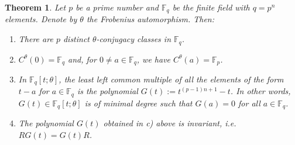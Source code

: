 \documentclass{amsproc}
\newtheorem{theorem}{Theorem}[section]
\numberwithin{equation}{section}
\begin{document}
\begin{theorem}
	\label{finite fields}	
	Let $p$ be a prime number and $\mathbb F_q$ be the finite field
	with $q=p^n$ elements.  Denote by $\theta$ the Frobenius
	automorphism.  Then:
	\begin{enumerate}
		\item[a)] There are $p$ distinct $\theta$-conjugacy classes in $\mathbb F_q$.
		\item[b)] $C^{\theta}(0)=\mathbb F_q$ and, for $0\ne a\in \mathbb F_q$, we have
		$C^{\theta}(a)=\mathbb F_p$.
		\item[c)] In $\mathbb F_q[t;\theta]$, the least left common multiple of all the elements
		of the form $t-a$ for $ a\in\mathbb F_q$ is the polynomial
		$G(t):=t^{(p-1)n +1}-t$.  In other words, $G(t)\in \mathbb
		F_q[t;\theta]$ is of minimal degree such that $G(a)=0$ for all
		$a\in \mathbb F_q$.
		\item[d)] The polynomial $G(t)$ obtained in c) above is invariant,
		i.e. $RG(t)=G(t)R$.
	\end{enumerate}
\end{theorem}
\end{document}
